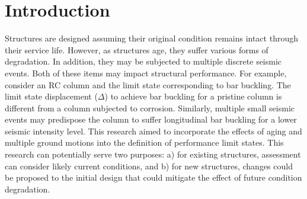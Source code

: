 \chapter{Introduction}
\label{chap-one}

Structures are designed assuming their original condition remains intact through their service life. However, as structures age, they suffer various forms of degradation. In addition, they may be subjected to multiple discrete seismic events. Both of these items may impact structural performance. For example, consider an RC column and the limit state corresponding to bar buckling. The limit state displacement ($\Delta$) to achieve bar buckling for a pristine column is different from a column subjected to corrosion.
Similarly, multiple small seismic events may predispose the column to suffer longitudinal bar buckling for a lower seismic intensity level. This research aimed to incorporate the effects of aging and multiple ground motions into the definition of performance limit states. This research can potentially serve two purposes: a) for existing structures, assessment can consider likely current conditions, and b) for new structures, changes could be proposed to the initial design that could mitigate the effect of future condition degradation.

